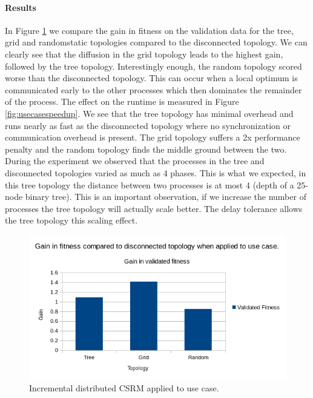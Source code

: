 \paragraph{Results}
In Figure \ref{fig:usecasedistributed} we compare the gain in fitness on the validation data for the tree, grid and randomstatic topologies compared to the disconnected topology. We can clearly see that the diffusion in the grid topology leads to the highest gain, followed by the tree topology. Interestingly enough, the random topology scored worse than the disconnected topology. This can occur when a local optimum is communicated early to the other processes which then dominates the remainder of the process. The effect on the runtime is measured in Figure \ref{fig:usecasespeedup}. We see that the tree topology has minimal overhead and runs nearly as fast as the disconnected topology where no synchronization or communication overhead is present. The grid topology suffers a 2x performance penalty and the random topology finds the middle ground between the two. During the experiment we observed that the processes in the tree and disconnected topologies varied as much as 4 phases. This is what we expected, in this tree topology the distance between two processes is at most 4 (depth of a 25-node binary tree). This is an important observation, if we increase the number of processes the tree topology will actually scale better. The delay tolerance allows the tree topology this scaling effect.
\begin{figure}
    \centering
    \includegraphics[width=\textwidth,height=\textheight,keepaspectratio]{figures/usecasedistributed.png}
    \caption{Incremental distributed CSRM applied to use case.}
    \label{fig:usecasedistributed}
\end{figure}
